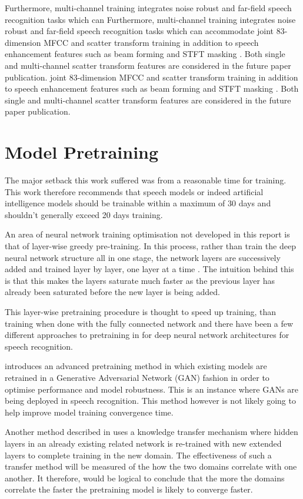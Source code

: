 Furthermore, multi-channel training integrates noise robust and far-field speech recognition tasks which can Furthermore, multi-channel training integrates noise robust and far-field speech recognition tasks which can accommodate joint 83-dimension MFCC and scatter transform training in addition to speech enhancement features such as beam forming and STFT masking \cite{ochiai2017multichannel}. Both single and multi-channel scatter transform features are considered in the future paper publication. joint 83-dimension MFCC and scatter transform training in addition to speech enhancement features such as beam forming and STFT masking \cite{ochiai2017multichannel}. Both single and multi-channel scatter transform features are considered in the future paper publication.

\section{Model Pretraining}
The major setback this work suffered was from a reasonable time for training.  This work therefore recommends that speech models or indeed artificial intelligence models should be trainable within a maximum of 30 days and shouldn't generally exceed 20 days training.

An area of neural network training optimisation not developed in this report is that of layer-wise greedy pre-training.  In this process, rather than train the deep neural network structure all in one stage, the network layers are successively added and trained layer by layer, one layer at a time \citep{Goodfellow-et-al-2016}.  The intuition behind this is that this makes the layers saturate much faster as the previous layer has already been saturated before the new layer is being added.

This layer-wise pretraining procedure is thought to speed up training, than training when done with the fully connected network and there have been a few different approaches to pretraining in for deep neural network architectures for speech recognition. 

\cite{hendrycks2019using} introduces an advanced pretraining method in which existing models are retrained in a Generative Adversarial Network (GAN) fashion in order to optimise performance and model robustness.  This is an instance where GANs are being deployed in speech recognition.  This method however is not likely going to help improve model training convergence time.

Another method described in \citep{ramachandran2016unsupervised,} uses a knowledge transfer mechanism where hidden layers in an already existing related network is re-trained with new extended layers to complete training in the new domain.  The effectiveness of such a transfer method will be measured of the how the two domains correlate with one another. It therefore, would be logical to conclude that the more the domains correlate the faster the pretraining model is likely to converge faster.

